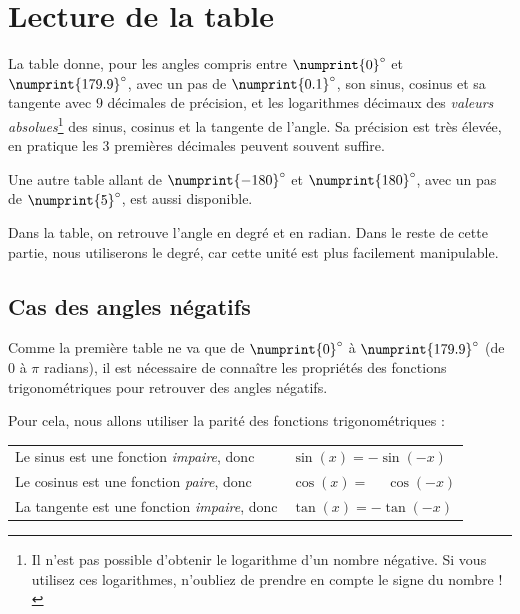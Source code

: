 \documentclass[a4paper]{article}
\begin{document}
\newpage

	\section{Lecture de la table}

	La table donne, pour les angles compris entre $\numprint{0}^\circ$ et $\numprint{179.9}^\circ$, avec un pas de $\numprint{0.1}^\circ$, 
	son sinus, cosinus et sa tangente avec $9$ décimales de précision, 
	et les logarithmes décimaux des \emph{valeurs absolues}\footnote{Il n'est pas possible d'obtenir le logarithme d'un nombre négative. Si vous utilisez ces logarithmes, n'oubliez de prendre en compte le signe du nombre !} 
	des sinus, cosinus et la tangente de l'angle.
	Sa précision est très élevée, en pratique les 3 premières décimales peuvent souvent suffire.

	Une autre table allant de $\numprint{-180}^\circ$ et $\numprint{180}^\circ$, avec un pas de $\numprint{5}^\circ$,
	est aussi disponible.

	Dans la table, on retrouve l'angle en degré et en radian. Dans le reste de cette partie, nous utiliserons le degré,
	car cette unité est plus facilement manipulable.

		\subsection{Cas des angles négatifs}
			
			Comme la première table ne va que de $\numprint{0}^\circ$ à $\numprint{179.9}^\circ$ (de $0$ à $\pi$ radians),
			il est nécessaire de connaître les propriétés des fonctions trigonométriques pour retrouver des angles négatifs.

			\vspace{4 mm}

			{ \parindent=0cm Pour cela, nous allons utiliser la parité des fonctions trigonométriques :}

			\vspace{1 mm}

			\begin{tabular}{ll}
				Le sinus est une fonction \emph{impaire}, donc & $\sin(x) = -\sin(-x)$\\
				Le cosinus est une fonction \emph{paire}, donc & $\cos(x) = \phantom{-}\cos(-x)$\\
				La tangente est une fonction \emph{impaire}, donc & $\tan(x) = -\tan(-x)$\\
			\end{tabular}
\end{document}
